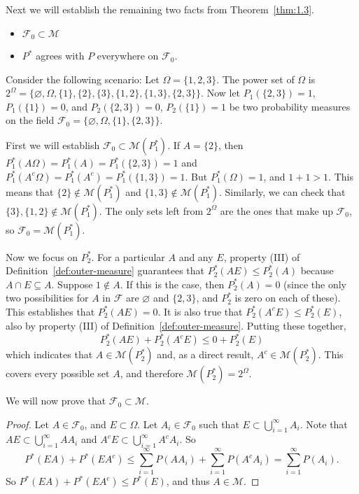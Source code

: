 \documentclass[11pt,fleqn]{book} %
\begin{document}
Next we will establish the remaining two facts from Theorem~\ref{thm:1.3}.
\begin{itemize}
	\item $\mathcal{F}_0 \subset \mathcal{M}$
	\item $P^*$ agrees with $P$ everywhere on $\mathcal{F}_0$.
\end{itemize}

\begin{example}[Exercise 3.3(a)]
	Consider the following scenario: Let $\Omega = \{1,2,3\}$. The power set of $\Omega$ is $2^\Omega = \{\varnothing,\Omega,\{1\},\{2\},\{3\},\{1,2\},\{1,3\},\{2,3\}\}$. Now let $P_1(\{2,3\}) = 1$, $P_1(\{1\})=0$, and $P_2(\{2,3\})=0$, $P_2(\{1\})=1$ be two probability measures on the field $\mathcal{F}_0 = \{\varnothing,\Omega,\{1\},\{2,3\}\}$.

	First we will establish $\mathcal{F}_0 \subset \mathcal{M}(P_1^*)$.
	If $A = \{2\}$, then $P_1^*(A\Omega) = P_1^*(A) = P_1^*(\{2,3\}) = 1$ and $P_1^*(A^c\Omega) = P_1^*(A^c) = P_1^*(\{1,3\}) = 1$. But $P_1^*(\Omega) = 1$, and $1+1 > 1$. This means that $\{2\} \notin \mathcal{M}(P_1^*)$ and $\{1,3\} \notin \mathcal{M}(P_1^*)$. Similarly, we can check that $\{3\}, \{1,2\} \notin \mathcal{M}(P_1^*)$. The only sets left from $2^\Omega$ are the ones that make up $\mathcal{F}_0$, so $\mathcal{F}_0 = \mathcal{M}(P_1^*)$.

	Now we focus on $P_2^*$. For a particular $A$ and any $E$, property (III) of Definition~\ref{def:outer-measure} guarantees that $P_2^*(AE) \leq P_2^*(A)$ because $A \cap E \subseteq A$. Suppose $1 \notin A$. If this is the case, then $P_2^*(A) = 0$ (since the only two possibilities for $A$ in $\mathcal{F}$ are $\varnothing$ and $\{2,3\}$, and $P_2^*$ is zero on each of these). This establishes that $P_2^*(AE) = 0$. It is also true that $P_2^*(A^cE) \leq P_2^*(E)$, also by property (III) of Definition~\ref{def:outer-measure}. Putting these together,
	\[
		P_2^*(AE) + P_2^*(A^cE) \leq 0 + P_2^*(E)
	\]
	which indicates that $A \in \mathcal{M}(P_2^*)$ and, as a direct result, $A^c \in \mathcal{M}(P_2^*)$. This covers every possible set $A$, and therefore $\mathcal{M}(P_2^*) = 2^\Omega$.
\end{example}

We will now prove that $\mathcal{F}_0 \subset \mathcal{M}$.

\begin{proof}
	Let $A \in \mathcal{F}_0$, and $E \subset \Omega$. Let $A_i \in \mathcal{F}_0$ such that $E \subset \bigcup_{i=1}^\infty A_i$. Note that $AE \subset \bigcup_{i=1}^\infty AA_i$ and $A^cE \subset \bigcup_{i=1}^\infty A^cA_i$. So
	\[
		P^*(EA) + P^*(EA^c) \leq \sum_{i=1}^\infty P(AA_i) + \sum_{i=1}^\infty P(A^cA_i) = \sum_{i=1}^\infty P(A_i).
	\]
	So $P^*(EA) + P^*(EA^c) \leq P^*(E)$, and thus $A \in \mathcal{M}$.
\end{proof}
\end{document}
